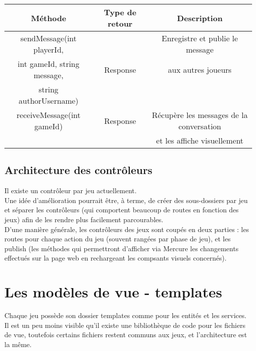 \documentclass{article}
\begin{document}
             \begin{center}
                \begin{tabular}{|| c | c | c ||}
                \hline 
                    Méthode & Type de retour & Description \\
                    \hline
                    \hline
                    sendMessage(int playerId, &  & Enregistre et publie le message \\
                    int gameId, string message, & Response & aux autres joueurs \\
                    string authorUsername) & & \\
                    \hline
                    receiveMessage(int gameId) & Response & Récupère les messages de la conversation \\
                    & & et les affiche visuellement \\
                    \hline
                \end{tabular}
            \end{center}

        \subsection{Architecture des contrôleurs}
            Il existe un contrôleur par jeu actuellement.\\
            \indent Une idée d'amélioration pourrait être, à terme, de créer des sous-dossiers par jeu et séparer les contrôleurs (qui comportent beaucoup de routes en fonction des jeux) afin de les rendre plus facilement parcourables.\\
            \indent D'une manière générale, les contrôleurs des jeux sont coupés en deux parties : les routes pour chaque action du jeu (souvent rangées par phase de jeu), et les publish (les méthodes qui permettront d'afficher via Mercure les changements effectués sur la page web en rechargeant les compsants visuels concernés).

    \newpage
    \section{Les modèles de vue - templates}

        Chaque jeu possède son dossier templates comme pour les entités et les services. Il est un peu moins visible qu'il existe une bibliothèque de code pour les fichiers de vue, toutefois certains fichiers restent communs aux jeux, et l'architecture est la même.
\end{document}

